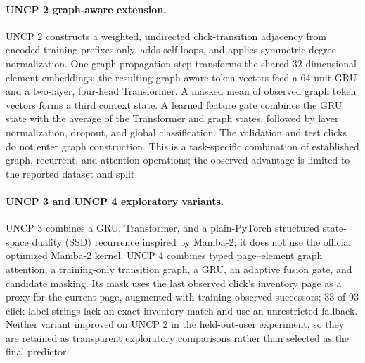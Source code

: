\documentclass[sn-mathphys-num, Numbered]{sn-jnl}%
\theoremstyle{thmstyleone}%
\theoremstyle{thmstyletwo}%
\theoremstyle{thmstylethree}%
\providecommand{\DIFadd}[1]{{\protect\color{green!40!black}#1}} %
\providecommand{\DIFdel}[1]{}                      %
\providecommand{\DIFaddbegin}{} %
\providecommand{\DIFaddend}{} %
\providecommand{\DIFdelbegin}{} %
\providecommand{\DIFdelend}{} %
\newcommand{\DIFscaledelfig}{0.5}
\newlength{\DIFdelgraphicswidth} %
\newlength{\DIFdelgraphicsheight} %
\newcommand{\DIFaddincludegraphics}[2][]{{\color{blue}\fbox{\DIFOincludegraphics[#1]{#2}}}} %
\newcommand{\DIFdelincludegraphics}[2][]{%
\sbox{\DIFdelgraphicsbox}{\DIFOincludegraphics[#1]{#2}}%
\settoboxwidth{\DIFdelgraphicswidth}{\DIFdelgraphicsbox} %
\settoboxtotalheight{\DIFdelgraphicsheight}{\DIFdelgraphicsbox} %
\scalebox{\DIFscaledelfig}{%
\parbox[b]{\DIFdelgraphicswidth}{\usebox{\DIFdelgraphicsbox}\\[-\baselineskip] \rule{\DIFdelgraphicswidth}{0em}}\llap{\resizebox{\DIFdelgraphicswidth}{\DIFdelgraphicsheight}{%
\setlength{\unitlength}{\DIFdelgraphicswidth}%
\begin{picture}(1,1)%
\thicklines\linethickness{2pt} %
{\color[rgb]{1,0,0}\put(0,0){\framebox(1,1){}}}%
{\color[rgb]{1,0,0}\put(0,0){\line( 1,1){1}}}%
{\color[rgb]{1,0,0}\put(0,1){\line(1,-1){1}}}%
\end{picture}%
}\hspace*{3pt}}} %
} %
\DeclareRobustCommand{\DIFaddbegin}{\DIFOaddbegin \let\includegraphics\DIFaddincludegraphics} %
\DeclareRobustCommand{\DIFaddend}{\DIFOaddend \let\includegraphics\DIFOincludegraphics} %
\DeclareRobustCommand{\DIFdelbegin}{\DIFOdelbegin \let\includegraphics\DIFdelincludegraphics} %
\DeclareRobustCommand{\DIFdelend}{\DIFOaddend \let\includegraphics\DIFOincludegraphics} %
\begin{document}
\paragraph{\DIFadd{UNCP 2 graph-aware extension.}} \DIFadd{UNCP 2 constructs a weighted, undirected click-transition adjacency from encoded training prefixes only, adds self-loops, and applies symmetric degree normalization. One graph propagation step transforms the shared 32-dimensional element embeddings; the resulting graph-aware token vectors feed a 64-unit GRU and a two-layer, four-head Transformer. A masked mean of observed graph token vectors forms a third context state. A learned feature gate combines the GRU state with the average of the Transformer and graph states, followed by layer normalization, dropout, and global classification. The validation and test clicks do not enter graph construction. This is a task-specific combination of established graph, recurrent, and attention operations; the observed advantage is limited to }\DIFaddend the \DIFdelbegin \DIFdel{risk of collecting inaccurate datasets (especially in lab settings), and the inability to test the entire user base.
The persona method, which generalizes results from representative user groups, also fails to reliably produce accurate datasets due to varied user behaviors under different conditions. Furthermore, the periodic nature of UX testing leads to wasted time for researchers. The text concludes by reviewing UX testing methods that have the potential to be executed by models like neural networks}\DIFdelend \DIFaddbegin \DIFadd{reported dataset and split.
}

\paragraph{\DIFadd{UNCP 3 and UNCP 4 exploratory variants.}} \DIFadd{UNCP 3 combines a GRU, Transformer, and a plain-PyTorch structured state-space duality (SSD) recurrence inspired by Mamba-2; it does not use the official optimized Mamba-2 kernel. UNCP 4 combines typed page--element graph attention, a training-only transition graph, a GRU, an adaptive fusion gate, and candidate masking. Its mask uses the last observed click's inventory page as a proxy for the current page, augmented with training-observed successors; 33 of 93 click-label strings lack an exact inventory match and use an unrestricted fallback. Neither variant improved on UNCP 2 in the held-out-user experiment, so they are retained as transparent exploratory comparisons rather than selected as the final predictor}\DIFaddend .
\end{document}
